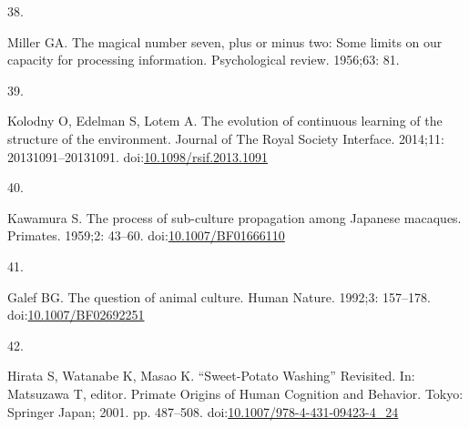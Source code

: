 \documentclass[10pt,letterpaper]{article}
\newlength{\cslhangindent}
\newlength{\csllabelwidth}
\newlength{\cslentryspacingunit} %
\newenvironment{CSLReferences}[2] %
 {%
  \setlength{\parindent}{0pt}
  \ifodd #1
  \let\oldpar\par
  \def\par{\hangindent=\cslhangindent\oldpar}
  \fi
  \setlength{\parskip}{#2\cslentryspacingunit}
 }%
 {}
\newcommand{\CSLLeftMargin}[1]{\parbox[t]{\csllabelwidth}{#1}}
\newcommand{\CSLRightInline}[1]{\parbox[t]{\linewidth - \csllabelwidth}{#1}\break}
\begin{document}
\begin{CSLReferences}{0}{0}
\leavevmode{}%
\CSLLeftMargin{38. }
\CSLRightInline{Miller GA. The magical number seven, plus or minus two:
{Some} limits on our capacity for processing information. Psychological
review. 1956;63: 81. }

\leavevmode{}%
\CSLLeftMargin{39. }
\CSLRightInline{Kolodny O, Edelman S, Lotem A. The evolution of
continuous learning of the structure of the environment. Journal of The
Royal Society Interface. 2014;11: 20131091--20131091.
doi:\href{https://doi.org/10.1098/rsif.2013.1091}{10.1098/rsif.2013.1091}}

\leavevmode{}%
\CSLLeftMargin{40. }
\CSLRightInline{Kawamura S. The process of sub-culture propagation among
{Japanese} macaques. Primates. 1959;2: 43--60.
doi:\href{https://doi.org/10.1007/BF01666110}{10.1007/BF01666110}}

\leavevmode{}%
\CSLLeftMargin{41. }
\CSLRightInline{Galef BG. The question of animal culture. Human Nature.
1992;3: 157--178.
doi:\href{https://doi.org/10.1007/BF02692251}{10.1007/BF02692251}}

\leavevmode{}%
\CSLLeftMargin{42. }
\CSLRightInline{Hirata S, Watanabe K, Masao K. {``{Sweet}-{Potato}
{Washing}''} {Revisited}. In: Matsuzawa T, editor. Primate {Origins} of
{Human} {Cognition} and {Behavior}. Tokyo: Springer Japan; 2001. pp.
487--508.
doi:\href{https://doi.org/10.1007/978-4-431-09423-4_24}{10.1007/978-4-431-09423-4\_24}}

\end{CSLReferences}

\nolinenumbers
\end{document}
